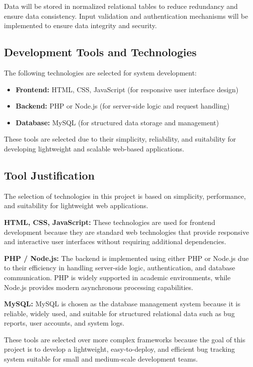 \documentclass[12pt]{article}
\begin{document}
Data will be stored in normalized relational tables to reduce redundancy and ensure data consistency. Input validation and authentication mechanisms will be implemented to ensure data integrity and security.

\subsection{Development Tools and Technologies}

The following technologies are selected for system development:

\begin{itemize}
    \item \textbf{Frontend:} HTML, CSS, JavaScript (for responsive user interface design)
    \item \textbf{Backend:} PHP or Node.js (for server-side logic and request handling)
    \item \textbf{Database:} MySQL (for structured data storage and management)
\end{itemize}
These tools are selected due to their simplicity, reliability, and suitability for developing lightweight and scalable web-based applications.
\subsection{Tool Justification}

The selection of technologies in this project is based on simplicity, performance, and suitability for lightweight web applications.

\textbf{HTML, CSS, JavaScript:} These technologies are used for frontend development because they are standard web technologies that provide responsive and interactive user interfaces without requiring additional dependencies.

\textbf{PHP / Node.js:} The backend is implemented using either PHP or Node.js due to their efficiency in handling server-side logic, authentication, and database communication. PHP is widely supported in academic environments, while Node.js provides modern asynchronous processing capabilities.

\textbf{MySQL:} MySQL is chosen as the database management system because it is reliable, widely used, and suitable for structured relational data such as bug reports, user accounts, and system logs.

These tools are selected over more complex frameworks because the goal of this project is to develop a lightweight, easy-to-deploy, and efficient bug tracking system suitable for small and medium-scale development teams.
\end{document}
